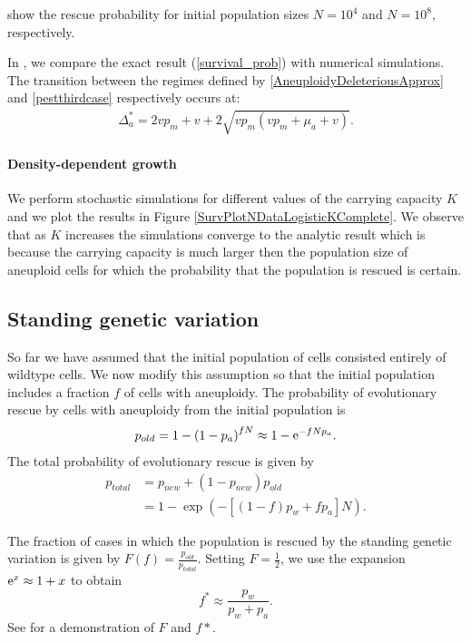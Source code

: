 \documentclass[12pt]{extarticle}
\newcommand{\e}{{\rm e}}
\begin{document}
 show the rescue probability for initial population sizes $N=10^4$ and $N=10^8$, respectively. %

In , we compare the exact result (\cref{survival_prob}) with numerical simulations. The transition between the regimes defined by \cref{AneuploidyDeleteriousApprox} and \cref{pestthirdcase} respectively occurs at:
\begin{align}\label{thresholdvalueaneuploid}
\Delta_a^*=2vp_m+v+2\sqrt{vp_m\left(vp_m+\mu_a+v\right)}.
\end{align}


\paragraph*{Density-dependent growth}

We perform stochastic simulations for different values of the carrying capacity $K$ and we plot the results in Figure \ref{SurvPlotNDataLogisticKComplete}.  We observe that as $K$ increases the simulations converge to the analytic result which is because the carrying capacity is much larger then the population size of aneuploid cells for which the probability that the population is rescued is certain.


\subsection*{Standing genetic variation}

So far we have assumed that the initial population of cells consisted entirely of wildtype cells.
We now modify this assumption so that the initial population includes a fraction $f$ of cells with aneuploidy.
The probability of evolutionary rescue by cells with aneuploidy from the initial population is
\begin{equation*}
p_{old} = 1-\left(1-p_a\right)^{fN}\approx 1-\e^{-fNp_a}.
\end{equation*}
The total probability of evolutionary rescue is given by
\begin{align}\nonumber
p_{total} 	&= p_{new}+\left(1-p_{new}\right)p_{old}\\
			&= 1-\exp\left(-\left[\left(1-f\right)p_w + fp_a\right]N\right) .
\end{align}

The fraction of cases in which the population is rescued by the standing genetic variation is given by $F\left(f\right)=\frac{p_{old}}{p_{total}}$.
Setting $F=\frac{1}{2}$, we use the expansion $\e^x \approx 1+x$ to obtain
\begin{equation}\label{halfeqstandvar}
f^*\approx\frac{p_w}{p_w+p_a}.
\end{equation}
See  for a demonstration of $F$ and $f*$.
\end{document}
